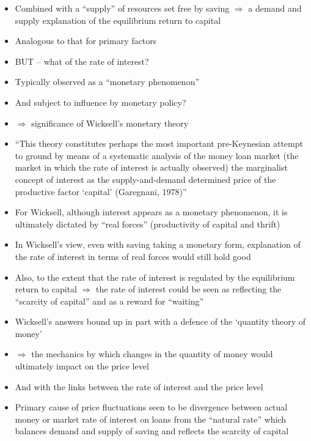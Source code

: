 \documentclass{article}
\begin{document}
\begin{itemize}
\begin{figure}[H]
		\end{figure}
		\item Combined with a ``supply'' of resources set free by saving \( \Rightarrow \) a demand and supply explanation of the equilibrium return to capital 
		\item Analogous to that for primary factors
		\item BUT -- what of the rate of interest?
		\item Typically observed as a ``monetary phenomenon''
		\item And subject to influence by monetary policy?
		\item \( \Rightarrow \) significance of Wicksell's monetary theory
		\item  ``This theory constitutes perhaps the most important pre-Keynesian attempt to ground by means of a systematic analysis of the money loan market (the market in which the rate of interest is actually observed) the marginalist concept of interest as the supply-and-demand determined price of the productive factor `capital' (Garegnani, 1978)''
		\item For Wicksell, although interest appears as a monetary phenomenon, it is ultimately dictated by ``real forces'' (productivity of capital and thrift)
		\item In Wicksell's view, even with saving taking a monetary form, explanation of the rate of interest in terms of real forces would still hold good
		\item Also, to the extent that the rate of interest is regulated by the equilibrium return to capital \( \Rightarrow \) the rate of interest could be seen as reflecting the ``scarcity of capital'' and as a reward for ``waiting''
		\item  Wicksell's answers bound up in part with a defence of the `quantity theory of money'
		\item \( \Rightarrow \) the mechanics by which changes in the quantity of money would ultimately impact on the price level
		\item And with the links between the rate of interest and the price level
		\item Primary cause of price fluctuations seen to be divergence between actual money or market rate of interest on loans from the ``natural rate'' which balances demand and supply of saving and reflects the scarcity of capital

\end{itemize}
\end{document}
